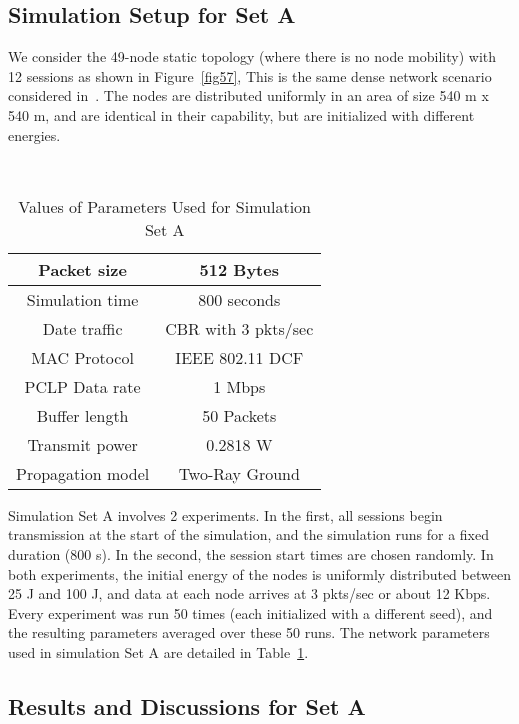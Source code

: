 \subsection{Simulation Setup for Set A}

We consider the 49-node static topology (where there is no node mobility) with 12 sessions as shown in Figure~\ref{fig57}, This is the same dense network scenario considered in~\cite{mdr}. The nodes are distributed uniformly in an area of size 540 m x 540 m, and are identical in their capability, but 
are initialized with different energies.

\begin{table}[htbp]
 \centering
  \caption{Values of Parameters Used for Simulation Set A} 
  \hfill \\
  \begin{tabular}{|c|c|}
  \hline
  Packet size & 512 Bytes\\
  \hline
  Simulation time & 800 seconds\\
  \hline
  Date traffic & CBR with 3 pkts/sec\\
  \hline
  MAC Protocol & IEEE 802.11 DCF\\
  \hline
  PCLP Data rate & 1 Mbps\\
  \hline
  Buffer length & 50 Packets\\
  \hline
  Transmit power & 0.2818 W\\
  \hline
  Propagation model & Two-Ray Ground\\
  \hline
  \end{tabular}
  \label{tab55}
\end{table}

Simulation Set A involves 2 experiments. In the first, all sessions begin transmission at the start of the simulation, and the simulation runs for a fixed duration (800 s). In the second, the session start times are chosen 
randomly. In both experiments, the initial energy of the nodes is uniformly distributed between 25 J and 100 J, and data at each node arrives at
3 pkts/sec or about 12 Kbps. Every experiment was run 50 times (each initialized with a different seed), and the resulting parameters averaged over these 50 runs. The network parameters used in simulation Set A are detailed in Table~\ref{tab55}.

\subsection{Results and Discussions for Set A}
\label{results-seta}

